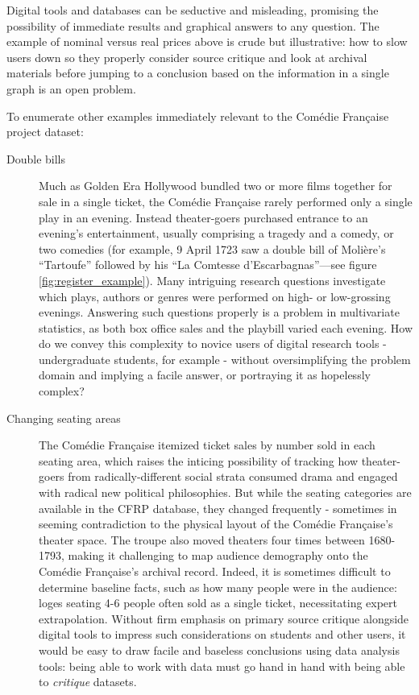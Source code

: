 \documentclass[	DIV=calc,%
							paper=a4,%
							fontsize=11pt,%
							twocolumn]{scrartcl}	 					%
\begin{document}
Digital tools and databases can be seductive and misleading, promising the possibility of immediate results and graphical answers to any question.  The example of nominal versus real prices above is crude but illustrative: how to slow users down so they properly consider source critique and look at archival materials before jumping to a conclusion based on the information in a single graph is an open problem.

To enumerate other examples immediately relevant to the Comédie Française project dataset:

\begin{description}
	\item[Double bills] Much as Golden Era Hollywood bundled two or more films together for sale in a single ticket, the Comédie Française rarely performed only a single play in an evening.  Instead theater-goers purchased entrance to an evening's entertainment, usually comprising a tragedy and a comedy, or two comedies (for example, 9 April 1723 saw a double bill of Molière's ``Tartoufe'' followed by his ``La Comtesse d'Escarbagnas''---see figure \ref{fig:register_example}).  Many intriguing research questions investigate which plays, authors or genres were performed on high- or low-grossing evenings.  Answering such questions properly is a problem in multivariate statistics, as both box office sales and the playbill varied each evening.  How do we convey this complexity to novice users of digital research tools - undergraduate students, for example - without oversimplifying the problem domain and implying a facile answer, or portraying it as hopelessly complex?

	\item[Changing seating areas] The Comédie Française itemized ticket sales by number sold in each seating area, which raises the inticing possibility of tracking how theater-goers from radically-different social strata consumed drama and engaged with radical new political philosophies.  But while the seating categories are available in the CFRP database, they changed frequently - sometimes in seeming contradiction to the physical layout of the Comédie Française's theater space.  The troupe also moved theaters four times between 1680-1793, making it challenging to map audience demography onto the Comédie Française's archival record.  Indeed, it is sometimes difficult to determine baseline facts, such as how many people were in the audience:  loges seating 4-6 people often sold as a single ticket, necessitating expert extrapolation.  Without firm emphasis on primary source critique alongside digital tools to impress such considerations on students and other users, it would be easy to draw facile and baseless conclusions using data analysis tools: being able to work with data must go hand in hand with being able to \emph{critique} datasets.


\end{description}
\end{document}

